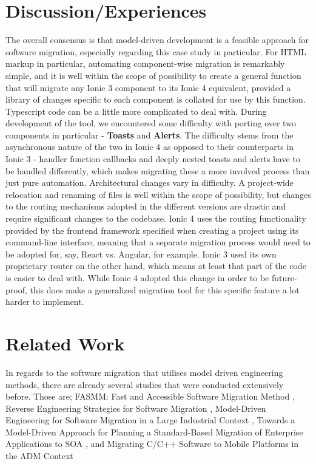 \documentclass[conference]{IEEEtran}
\begin{document}
\section{Discussion/Experiences}
The overall consensus is that model-driven development is a feasible approach
for software migration, especially regarding this case study in particular.
\newline \newline
For HTML markup in particular, automating component-wise migration is remarkably simple, and it
is well within the scope of possibility to create a general function that will migrate any Ionic
3 component to its Ionic 4 equivalent, provided a library of changes specific to each component
is collated for use by this function.
\newline \newline
Typescript code can be a little more complicated to deal with. During development of the tool,
we encountered some difficulty with porting over two components in particular - \textbf{Toasts} and
\textbf{Alerts}. The difficulty stems from the asynchronous nature of the two in Ionic 4 as opposed to their
counterparts in Ionic 3 - handler function callbacks and deeply nested toasts and alerts have to be handled differently,
which makes migrating these a more involved process than just pure automation.
\newline \newline
Architectural changes vary in difficulty. A project-wide relocation and renaming of files is well within the
scope of possibility, but changes to the routing mechanisms adopted in the different versions are drastic and
require significant changes to the codebase. Ionic 4 uses the routing functionality provided by the frontend framework
specified when creating a project using its command-line interface, meaning that a separate migration process would need
to be adopted for, say, React vs. Angular, for example. Ionic 3 used its own proprietary router on the other hand, which means
at least that part of the code is easier to deal with. While Ionic 4 adopted this change in order to be future-proof, this does
make a generalized migration tool for this specific feature a lot harder to implement.

\section{Related Work}
In regards to the software migration that utilises model driven engineering methods,
there are already several studies that were conducted extensively before.
Those are; FASMM: 
Fast and Accessible Software Migration Method \cite{b3}, Reverse Engineering 
Strategies for Software Migration \cite{b4}, Model-Driven Engineering 
for Software Migration in a Large Industrial Context \cite{b5},  
Towards a Model-Driven Approach for Planning a 
Standard-Based Migration of Enterprise Applications to SOA  \cite{b6}, and
Migrating C/C++ Software to Mobile Platforms in the ADM Context \cite{b2}
\end{document}
